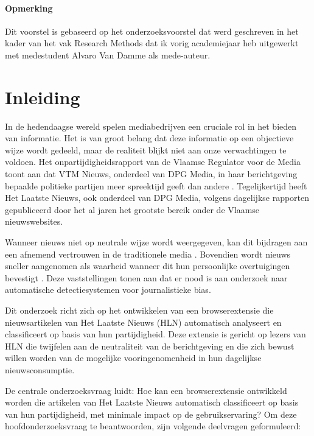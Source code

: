 \paragraph{Opmerking}

Dit voorstel is gebaseerd op het onderzoeksvoorstel dat werd geschreven in het kader van het vak Research Methods dat ik vorig academiejaar heb uitgewerkt met medestudent Alvaro Van Damme als mede-auteur.

\section{Inleiding}
\label{sec:inleiding}

In de hedendaagse wereld spelen mediabedrijven een cruciale rol in het bieden van informatie. Het is van groot belang dat deze informatie op een objectieve wijze wordt gedeeld, maar de realiteit blijkt niet aan onze verwachtingen te voldoen. Het onpartijdigheidsrapport van de Vlaamse Regulator voor de Media toont aan dat VTM Nieuws, onderdeel van DPG Media, in haar berichtgeving bepaalde politieke partijen meer spreektijd geeft dan andere \autocite{VanAelst2024}. Tegelijkertijd heeft Het Laatste Nieuws, ook onderdeel van DPG Media, volgens dagelijkse rapporten gepubliceerd door het \textcite{CIM2025} al jaren het grootste bereik onder de Vlaamse nieuwswebsites.

Wanneer nieuws niet op neutrale wijze wordt weergegeven, kan dit bijdragen aan een afnemend vertrouwen in de traditionele media \autocite{Hanjia2024}. Bovendien wordt nieuws sneller aangenomen als waarheid wanneer dit hun persoonlijke overtuigingen bevestigt \autocite{Schwalbe2024}. Deze vaststellingen tonen aan dat er nood is aan onderzoek naar automatische detectiesystemen voor journalistieke bias.

Dit onderzoek richt zich op het ontwikkelen van een browserextensie die nieuwsartikelen van Het Laatste Nieuws (HLN) automatisch analyseert en classificeert op basis van hun partijdigheid. Deze extensie is gericht op lezers van HLN die twijfelen aan de neutraliteit van de berichtgeving en die zich bewust willen worden van de mogelijke vooringenomenheid in hun dagelijkse nieuwsconsumptie.

De centrale onderzoeksvraag luidt: Hoe kan een browserextensie ontwikkeld worden die artikelen van Het Laatste Nieuws automatisch classificeert op basis van hun partijdigheid, met minimale impact op de gebruikservaring? Om deze hoofdonderzoeksvraag te beantwoorden, zijn volgende deelvragen geformuleerd:

